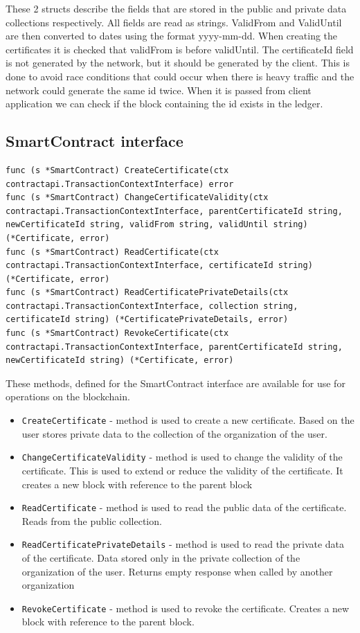 \documentclass[12pt]{article}
\begin{document}
These 2 structs describe the fields that are stored in the public and private data collections respectively. All fields are read as strings.
ValidFrom and ValidUntil are then converted to dates using the format yyyy-mm-dd.
When creating the certificates it is checked that validFrom is before validUntil.
The certificateId field is not generated by the network, but it should be generated by the client.
This is done to avoid race conditions that could occur when there is heavy traffic and the network could generate the same id twice.
When it is passed from client application we can check if the block containing the id exists in the ledger.

\subsection{SmartContract interface}

\begin{lstlisting}[language=Golang]
func (s *SmartContract) CreateCertificate(ctx contractapi.TransactionContextInterface) error
func (s *SmartContract) ChangeCertificateValidity(ctx contractapi.TransactionContextInterface, parentCertificateId string, newCertificateId string, validFrom string, validUntil string) (*Certificate, error)
func (s *SmartContract) ReadCertificate(ctx contractapi.TransactionContextInterface, certificateId string) (*Certificate, error)
func (s *SmartContract) ReadCertificatePrivateDetails(ctx contractapi.TransactionContextInterface, collection string, certificateId string) (*CertificatePrivateDetails, error)
func (s *SmartContract) RevokeCertificate(ctx contractapi.TransactionContextInterface, parentCertificateId string, newCertificateId string) (*Certificate, error)
\end{lstlisting}

These methods, defined for the SmartContract interface are available for use for operations on the blockchain.

\begin{itemize}
    \item \texttt{CreateCertificate} - method is used to create a new certificate. Based on the user stores private data to the collection of the organization of the user.
    \item \texttt{ChangeCertificateValidity} - method is used to change the validity of the certificate. This is used to extend or reduce the validity of the certificate. It creates a new block with reference to the parent block
    \item \texttt{ReadCertificate} - method is used to read the public data of the certificate. Reads from the public collection.
    \item \texttt{ReadCertificatePrivateDetails} - method is used to read the private data of the certificate. Data stored only in the private collection of the organization of the user. Returns empty response when called by another organization
    \item \texttt{RevokeCertificate} - method is used to revoke the certificate. Creates a new block with reference to the parent block.
\end{itemize}
\end{document}
